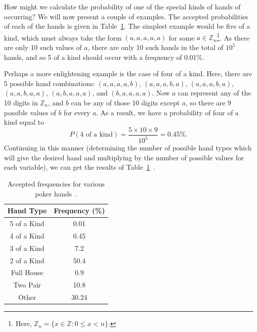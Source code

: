 \documentclass[12pt]{article}
\numberwithin{equation}{section}
\begin{document}
\par How might we calculate the probability of one of the special kinds of hands of occurring?  We will now present a couple of examples.  The accepted probabilities of each of the hands is given in Table~\ref{tab:pokeracc}.  The simplest example would be five of a kind, which must always take the form $(a,a,a,a,a)$ for some $a\in\mathbb{Z}_{n}$\footnote{Here, $\mathbb{Z}_{n}=\{x\in\mathbb{Z}:0\leq x < n\}$.}.  As there are only 10 such values of $a$, there are only 10 such hands in the total of $10^{5}$ hands, and so 5 of a kind should occur with a frequency of 0.01\%.
\par Perhaps a more enlightening example is the case of four of a kind.  Here, there are 5 possible hand combinations: $(a,a,a,a,b)$, $(a,a,a,b,a)$, $(a,a,a,b,a)$, $(a,a,b,a,a)$, $(a,b,a,a,a)$, and $(b,a,a,a,a)$.  Now $a$ can represent any of the 10 digits in $\mathbb{Z}_{n}$, and $b$ can be any of those 10 digits except $a$, so there are 9 possible values of $b$ for every $a$.  As a result, we have a probability of four of a kind equal to 
$$
P(\text{4 of a kind}) = \frac{5\times10\times9}{10^{5}} = 0.45\%.
$$
Continuing in this manner (determining the number of possible hand types which will give the desired hand and multiplying by the number of possible values for each variable), we can get the results of Table~\ref{tab:pokeracc}~\cite{drueke}.

\begin{table}[ht]
\begin{center}
\begin{tabular}{c|c} \hline
	Hand Type & Frequency (\%) \\ \hline
    5 of a Kind & 0.01\\
    4 of a Kind & 0.45\\
    3 of a Kind & 7.2\\
    2 of a Kind & 50.4\\
    Full House & 0.9\\
    Two Pair & 10.8\\ 
    Other & 30.24\\ \hline
\end{tabular}
\caption{Accepted frequencies for various poker hands~\cite{babington}.}
\label{tab:pokeracc}
\end{center}
\end{table}
\end{document}
